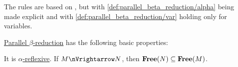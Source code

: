 \begin{comments}
  \item The rules are based on \cite[3.2.3]{Barendregt1984}, but with \ref{def:parallel_beta_reduction/alpha} being made explicit and with \ref{def:parallel_beta_reduction/var} holding only for variables.
\end{comments}

\begin{proposition}\label{thm:def:parallel_beta_reduction}
  \hyperref[def:parallel_beta_reduction]{Parallel \( \beta \)-reduction} has the following basic properties:
  \begin{thmenum}
     It is \hyperref[def:alpha_reflexive_closure]{\( \alpha \)-reflexive}.
     If \( M \pred N \), then \( \op*{Free}(N) \subseteq \op*{Free}(M) \).
  \end{thmenum}
\end{proposition}
